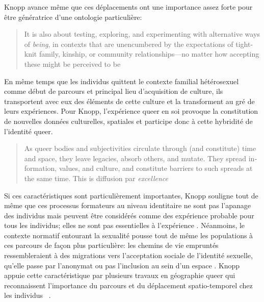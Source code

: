 Knopp avance même que ces déplacements ont une importance assez forte pour être génératrice d'une ontologie particulière:
\foreignblockquote{english}[{\cite[123]{Knopp2004}}][.]{It is also about
  testing, exploring, and experimenting with alternative ways of \emph{being},
  in contexts that are unencumbered by the expectations of tight-knit family,
  kinship, or community relationships—no matter how accepting these might be
  perceived to be} 
En même temps que les individus \lgbt{} quittent le contexte familial hétérosexuel comme début de parcours et principal lieu d'acquisition de culture, ils transportent avec eux des éléments de cette culture et la transforment au gré de leurs expériences. 
Pour Knopp, l'expérience queer en soi provoque la constitution de nouvelles données culturelles, spatiales et participe donc à cette hybridité de l'identité queer.
\foreignblockquote{english}[{\cite[130]{Knopp2004}}][.]{As queer bodies and
  subjectivities circulate through (and constitute) time and space, they leave
  legacies, absorb others, and mutate. They spread information, values, and
  culture, and constitute barriers to such spreads at the same time. This is
  diffusion par \emph{excellence}}

Si ces caractéristiques sont particulièrement importantes, Knopp souligne tout de même que ces processus formateurs au niveau identitaire ne sont pas l'apanage des individus \lgbt{} mais peuvent être considérés comme des expérience probable pour tous les individus; elles ne sont pas essentielles à l'expérience \lgbt{}.
Néanmoins, le contexte normatif entourant la sexualité pousse tout de même les populations \lgbt{} à ces parcours de façon plus particulière: les chemins de vie empruntés ressembleraient à des migrations vers l'acceptation sociale de l'identité sexuelle, qu'elle passe par l'anonymat ou pas l'inclusion au sein d'un espace \lgbt{}. 
Knopp appuie cette caractéristique par plusieurs travaux en géographie queer qui reconnaissent l'importance du parcours et du déplacement spatio-temporel chez les individus \lgbt{}~\citep[123]{Knopp2004}.



